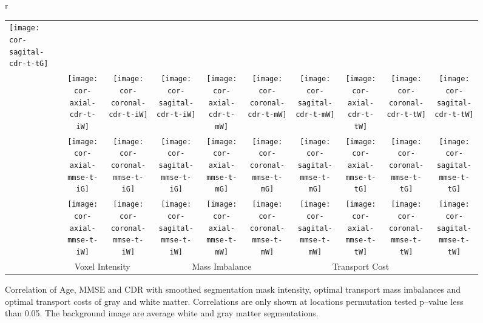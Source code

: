 \documentclass{llncs}
\begin{document}
\begin{figure}[h!]
\begin{tabular}{r}
\begin{tabular}{lc||ccc||ccc||ccc}
\texttt{[image: cor-sagital-cdr-t-tG]} 
  \\
  &
    \rotatebox[origin=c]{90}{W}&
\texttt{[image: cor-axial-cdr-t-iW]} &
\texttt{[image: cor-coronal-cdr-t-iW]} &
\texttt{[image: cor-sagital-cdr-t-iW]} &
\texttt{[image: cor-axial-cdr-t-mW]} &
\texttt{[image: cor-coronal-cdr-t-mW]} &
\texttt{[image: cor-sagital-cdr-t-mW]} &
\texttt{[image: cor-axial-cdr-t-tW]} &
\texttt{[image: cor-coronal-cdr-t-tW]} &
\texttt{[image: cor-sagital-cdr-t-tW]} 
  \\ \hline 
  \multirow{2}{*}{\rotatebox[origin=c]{90}{MMSE}} &
    \rotatebox[origin=c]{90}{G}&
\texttt{[image: cor-axial-mmse-t-iG]} &
\texttt{[image: cor-coronal-mmse-t-iG]} &
\texttt{[image: cor-sagital-mmse-t-iG]} &
\texttt{[image: cor-axial-mmse-t-mG]} &
\texttt{[image: cor-coronal-mmse-t-mG]} &
\texttt{[image: cor-sagital-mmse-t-mG]} &
\texttt{[image: cor-axial-mmse-t-tG]} &
\texttt{[image: cor-coronal-mmse-t-tG]} &
\texttt{[image: cor-sagital-mmse-t-tG]} 
  \\ 
  &
    \rotatebox[origin=c]{90}{W}&
\texttt{[image: cor-axial-mmse-t-iW]} &
\texttt{[image: cor-coronal-mmse-t-iW]} &
\texttt{[image: cor-sagital-mmse-t-iW]} &
\texttt{[image: cor-axial-mmse-t-mW]} &
\texttt{[image: cor-coronal-mmse-t-mW]} &
\texttt{[image: cor-sagital-mmse-t-mW]} &
\texttt{[image: cor-axial-mmse-t-tW]} &
\texttt{[image: cor-coronal-mmse-t-tW]} &
\texttt{[image: cor-sagital-mmse-t-tW]} 
  \\ \hline  \hline
  & \multicolumn{3}{c||}{Voxel Intensity}
  & \multicolumn{3}{c||}{Mass Imbalance}
  & \multicolumn{3}{c}{Transport Cost}
\end{tabular}
\end{tabular}
\caption{\label{fig:cor-oasis}
Correlation of Age, MMSE and CDR with smoothed segmentation mask intensity,
optimal transport mass imbalances and optimal transport costs of gray and white
matter.  Correlations are only shown at locations permutation tested p--value
less than 0.05. The background image are average white and gray matter
segmentations. 
\vspace{-7mm}
} 
\end{figure} 
\endgroup
\end{document}
